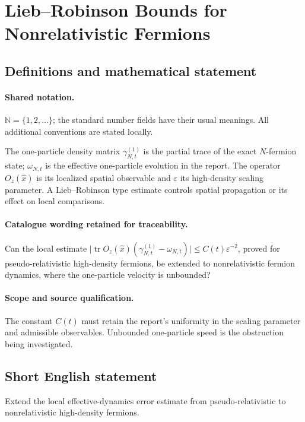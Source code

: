 \documentclass[11pt]{article}
\begin{document}
\section{Lieb–Robinson Bounds for Nonrelativistic Fermions}\label{statement}

\subsection{Definitions and mathematical statement}

\paragraph{Shared notation.}$\mathbb N=\{1,2,\ldots\}$; the standard number fields have their usual meanings. All additional conventions are stated locally.


The one-particle density matrix $\gamma^{(1)}_{N,t}$ is the partial trace of the exact $N$-fermion state; $\omega_{N,t}$ is the effective one-particle evolution in the report. The operator $O_z(\widehat x)$ is its localized spatial observable and $\varepsilon$ its high-density scaling parameter. A Lieb--Robinson type estimate controls spatial propagation or its effect on local comparisons.

\paragraph{Catalogue wording retained for traceability.}
Can the local estimate $\lvert\operatorname{tr} O_z(\widehat{x})(\gamma^{(1)}_{N,t}-\omega_{N,t})\rvert\leq C(t)\varepsilon^{-2}$, proved for pseudo-relativistic high-density fermions, be extended to nonrelativistic fermion dynamics, where the one-particle velocity is unbounded?

\paragraph{Scope and source qualification.}The constant $C(t)$ must retain the report's uniformity in the scaling parameter and admissible observables. Unbounded one-particle speed is the obstruction being investigated.
\subsection{Short English statement}
Extend the local effective-dynamics error estimate from pseudo-relativistic to nonrelativistic high-density fermions.
\end{document}
